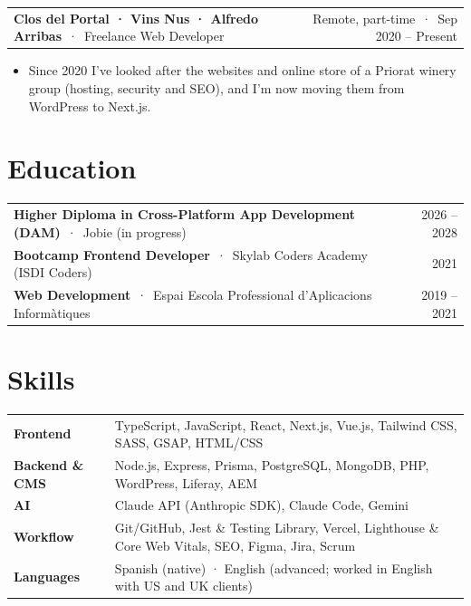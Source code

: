\documentclass[10pt,a4paper]{article}
\makeatletter
\newcommand{\role}[4]{%
  \begin{tabularx}{\linewidth}{@{}X r@{}}
    \textbf{#1} \,·\, #2 & \small\color{muted}#4 \,·\, #3
  \end{tabularx}\par\vspace{0pt}}
\makeatother
\begin{document}
\role{Clos del Portal · Vins Nus · Alfredo Arribas}{Freelance Web Developer}{Sep 2020 -- Present}{Remote, part-time}
\begin{itemize}
  \item Since 2020 I've looked after the websites and online store of a Priorat winery group (hosting, security and SEO), and I'm now moving them from WordPress to Next.js.
\end{itemize}

\section{Education}
\begin{tabularx}{\linewidth}{@{}X r@{}}
\textbf{Higher Diploma in Cross-Platform App Development (DAM)} \,·\, Jobie {\small(in progress)} & \small\color{muted}2026 -- 2028 \\[2pt]
\textbf{Bootcamp Frontend Developer} \,·\, Skylab Coders Academy (ISDI Coders) & \small\color{muted}2021 \\[2pt]
\textbf{Web Development} \,·\, Espai Escola Professional d'Aplicacions Informàtiques & \small\color{muted}2019 -- 2021 \\
\end{tabularx}

\section{Skills}
\begin{tabularx}{\linewidth}{@{}l X@{}}
\textbf{Frontend} & TypeScript, JavaScript, React, Next.js, Vue.js, Tailwind CSS, SASS, GSAP, HTML/CSS \\
\textbf{Backend \& CMS} & Node.js, Express, Prisma, PostgreSQL, MongoDB, PHP, WordPress, Liferay, AEM \\
\textbf{AI} & Claude API (Anthropic SDK), Claude Code, Gemini \\
\textbf{Workflow} & Git/GitHub, Jest \& Testing Library, Vercel, Lighthouse \& Core Web Vitals, SEO, Figma, Jira, Scrum \\
\textbf{Languages} & Spanish (native) · English (advanced; worked in English with US and UK clients) \\
\end{tabularx}
\end{document}
